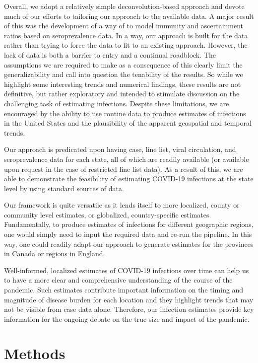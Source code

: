 \documentclass{article}
\begin{document}
Overall, we adopt a relatively simple deconvolution-based approach and devote
much of our efforts to tailoring our approach to the available data. A
major result of this was the development of a way of to model immunity and
ascertainment ratios based on seroprevalence data. 
In a way, our approach is built for the data rather than trying to force the data to fit
to an existing approach. However, the lack of data is both a barrier to entry
and a continual roadblock. The assumptions we are required to make as a
consequence of this clearly limit the generalizability and call into question
the tenability of the results. So while we highlight some interesting trends and
numerical findings, these results are not definitive, but rather exploratory and
intended to stimulate discussion on the challenging task of estimating
infections. Despite these limitations, we are encouraged by the ability to use
routine data to produce estimates of infections in the United States and the
plausibility of the apparent geospatial and temporal trends. 
 
Our approach is predicated upon having case, line list, viral circulation, and
seroprevalence data for each state, all of which are readily available (or
available upon request in the case of restricted line list data). As a result of
this, we are able to demonstrate the feasibility of estimating COVID-19
infections at the state level by using standard sources of data. 

Our framework is quite versatile as it lends itself to more localized, county or
community level estimates, or globalized, country-specific estimates.
Fundamentally, to produce estimates of infections for different geographic
regions, one would simply need to input the required data and re-run the
pipeline. In this way, one could readily adapt our approach to generate
estimates for the provinces in Canada or regions in England.

Well-informed, localized estimates of COVID-19 infections over time can help us
to have a more clear and comprehensive understanding of the course of the
pandemic. Such estimates contribute important information on the timing and
magnitude of disease burden for each location and they highlight trends that may
not be visible from case data alone. Therefore, our infection estimates provide
key information for the ongoing debate on the true size and impact of the
pandemic.

\section{Methods}
\end{document}
